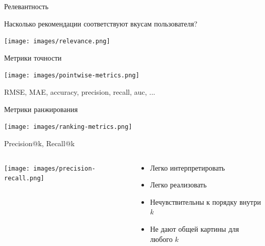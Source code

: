 \documentclass[11pt,aspectratio=169,handout]{beamer}
\begin{document}
\begin{frame}{Релевантность}

\begin{tcolorbox}[colback=info!5,colframe=info!80,title=]
Насколько рекомендации соответствуют вкусам пользователя?
\end{tcolorbox}

\begin{center}
\texttt{[image: images/relevance.png]}
\end{center}

\end{frame}

\begin{frame}{Метрики точности}

\begin{center}
\texttt{[image: images/pointwise-metrics.png]}
\end{center}
RMSE, MAE, accuracy, precision, recall, auc, ...

\end{frame}

\begin{frame}{Метрики ранжирования}

\begin{center}
\texttt{[image: images/ranking-metrics.png]}
\end{center}

\end{frame}

\begin{frame}{Precision@k, Recall@k}

\begin{columns}
\begin{column}{0.5\textwidth}
   \begin{center}
		\texttt{[image: images/precision-recall.png]}
   \end{center}
\end{column}
\begin{column}{0.4\textwidth}
    \begin{tcolorbox}[colback=info!5,colframe=info!80,title=]
      \begin{itemize}
      \item Легко интерпретировать
      \item Легко реализовать
      \end{itemize}
    \end{tcolorbox}
    \begin{tcolorbox}[colback=warn!5,colframe=warn!80,title=]
      \begin{itemize}
      \item Нечувствительны к порядку внутри $k$
      \item Не дают общей картины для любого $k$
      \end{itemize}
    \end{tcolorbox}
\end{column}
\end{columns}

\end{frame}
\end{document}
